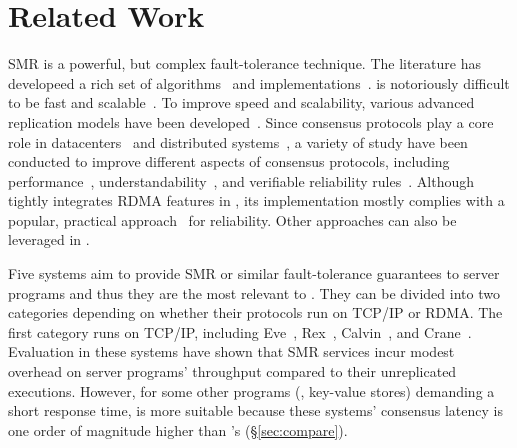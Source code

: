\section{Related Work} \label{sec:related}


  SMR is a powerful, but 
complex fault-tolerance technique. The literature has developeed a rich set of
\paxos 
algorithms~\cite{paxos:practical,paxos,paxos:simple,paxos:complex,epaxos:sosp13}
and implementations~\cite{paxos:live,paxos:practical,chubby:osdi}. \paxos is 
notoriously difficult to be fast and scalable~\cite{ellis:thesis}. To improve 
speed and scalability, various advanced replication models have been 
developed~\cite{epaxos:sosp13,mencius:osdi08,scatter:sosp11,manos:hotdep10}. 
Since consensus protocols play a core role in 
datacenters~\cite{matei:hotcloud11, mesos:nsdi11, datacenter:os} and distributed 
systems~\cite{spanner:osdi12,mencius:osdi08}, a variety of study have been 
conducted to improve different aspects of consensus protocols, including 
performance~\cite{epaxos:sosp13,paxos:fast,dare:hpdc15}, 
understandability~\cite{raft:usenix14,paxos}, and verifiable reliability 
rules~\cite{modist:nsdi09,demeter:sosp11}. Although \xxx tightly integrates 
RDMA features in \paxos, its implementation mostly complies with a popular, 
practical approach~\cite{paxos:practical} for reliability. Other \paxos 
approaches can also be leveraged in \xxx.

Five systems aim to provide SMR or similar fault-tolerance guarantees to server 
programs and thus they are the most relevant to \xxx. They can be divided into 
two categories depending on whether their protocols run on TCP/IP or RDMA. 
The first category runs on TCP/IP, including Eve~\cite{eve:osdi12}, 
Rex~\cite{rex:eurosys14}, Calvin~\cite{calvin:sigmod12}, and 
Crane~\cite{crane:sosp15}. Evaluation in these systems have shown that SMR 
services incur modest overhead on server programs' throughput compared to their 
unreplicated executions. However, for some other programs (\eg, key-value 
stores) demanding a short response time, \xxx is more suitable because these 
systems' consensus latency is one order of magnitude higher than \xxx's 
(\S\ref{sec:compare}).



